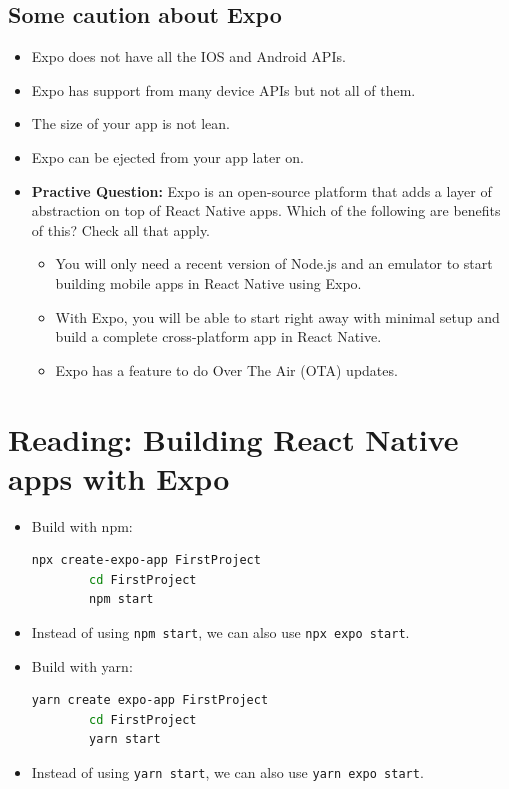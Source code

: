 \subsection{Some caution about Expo}
\begin{itemize}
    \item Expo does not have all the IOS and Android APIs.
    \item Expo has support from many device APIs but not all of them. 
    \item The size of your app is not lean.
    \item Expo can be ejected from your app later on.

    \item \textbf{Practive Question:} Expo is an open-source platform that adds a layer of abstraction on top of React Native apps.  Which of the following are benefits of this? Check all that apply.
    \begin{itemize}[label=$\circ$]
        \item You will only need a recent version of Node.js and an emulator to start building mobile apps in React Native using Expo.
        \item With Expo, you will be able to start right away with minimal setup and build a complete cross-platform app in React Native. 
        \item Expo has a feature to do Over The Air (OTA) updates.
    \end{itemize}
\end{itemize}

\section{Reading: Building React Native apps with Expo}
\begin{itemize}
    \item Build with npm:
    \begin{lstlisting}[language=Bash, numbers=none]
        npx create-expo-app FirstProject
        cd FirstProject
        npm start
    \end{lstlisting}
    \item Instead of using \texttt{npm start}, we can also use \texttt{npx expo start}.
    \item Build with yarn:
    \begin{lstlisting}[language=Bash, numbers=none]
        yarn create expo-app FirstProject
        cd FirstProject
        yarn start
    \end{lstlisting}
    \item Instead of using \texttt{yarn start}, we can also use \texttt{yarn expo start}.
\end{itemize}

